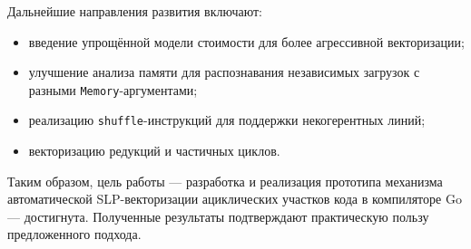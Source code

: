 Дальнейшие направления развития включают:
\begin{itemize}
    \item введение упрощённой модели стоимости для более агрессивной векторизации;
    \item улучшение анализа памяти для распознавания независимых загрузок с разными \texttt{Memory}-аргументами;
    \item реализацию \texttt{shuffle}-инструкций для поддержки некогерентных линий;
    \item векторизацию редукций и частичных циклов.
\end{itemize}

Таким образом, цель работы — разработка и реализация прототипа механизма автоматической SLP-векторизации 
ациклических участков кода в компиляторе Go — достигнута. 
Полученные результаты подтверждают практическую пользу предложенного подхода.
